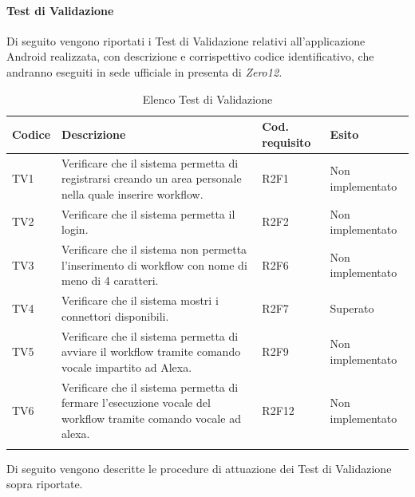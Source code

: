 \paragraph{Test di Validazione}
\label{sec:tvRA}
Di seguito vengono riportati i Test di Validazione relativi all'applicazione Android realizzata, con descrizione e corrispettivo codice identificativo, che andranno eseguiti in sede ufficiale in presenta di \textit{Zero12.}
\begin{center}
	\centering
	\renewcommand{\arraystretch}{1.5}
	\begin{longtable}{  p{1.2cm}  p{8.5cm} p{2cm} p{1.5cm} }
		\rowcolor{tableHeadYellow}
		\textbf{Codice}   & \textbf{Descrizione} & \textbf{Cod. \mbox{requisito}} & \textbf{Esito} \\ 
		\endhead
		TV1 & Verificare che il sistema permetta di registrarsi creando un area personale nella quale inserire workflow. & R2F1 & Non implementato \\
		TV2 & Verificare che il sistema permetta il login. & R2F2 & Non implementato \\
		TV3 & Verificare che il sistema non permetta l’inserimento di workflow con nome di meno di 4 caratteri. & R2F6 & Non implementato \\
		TV4 & Verificare che il sistema mostri i connettori disponibili. & R2F7 & Superato \\
		TV5 & Verificare che il sistema permetta di avviare il workflow tramite comando vocale impartito ad Alexa. & R2F9 & Non implementato \\
		TV6 & Verificare che il sistema permetta di fermare l’esecuzione vocale del workflow tramite comando vocale ad alexa. & R2F12 & Non implementato \\
		\rowcolor{white}
		\caption{Elenco Test di Validazione}
	\end{longtable}
\end{center}
Di seguito vengono descritte le procedure di attuazione dei Test di Validazione sopra riportate.
